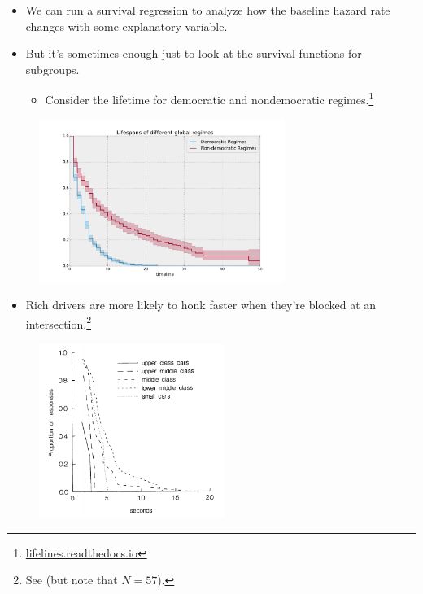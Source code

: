 \documentclass{beamer}
\begin{document}
\begin{frame}
	\begin{itemize}
		\item We can run a survival regression to analyze how the baseline hazard rate changes with some explanatory variable.
		\item But it's sometimes enough just to look at the survival functions for subgroups.
		\begin{itemize}
			\item Consider the lifetime for democratic and nondemocratic regimes.\footnote{\url{lifelines.readthedocs.io}}
		\end{itemize}
	\end{itemize}
	\begin{figure}
		\includegraphics[width=8cm]{lifelines-regimes.png}
		\centering
	\end{figure}
\end{frame}

\begin{frame}
	\begin{itemize}
		\item Rich drivers are more likely to honk faster when they're blocked at an intersection.\footnote{See \cite{diekmann1996social} (but note that $N=57$).}
	\end{itemize}
	\begin{figure}
		\includegraphics[width=6cm]{diekmann-cars.png}
		\centering
	\end{figure}
\end{frame}
\end{document}
